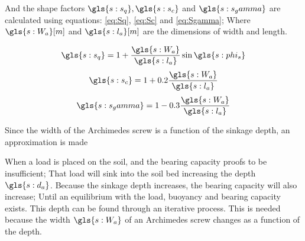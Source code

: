 \noindent And the shape factors $ \gls{s:s_q}, \gls{s:s_c} $ and $ \gls{s:s_gamma} $ are calculated using equations: \ref{eq:Sq}, \ref{eq:Sc} and \ref{eq:Sgamma}; Where $ \gls{s:W_a}  [m]$ and $ \gls{s:l_a} [m] $ are the dimensions of width and length.

\begin{sBox}
	\begin{equation}\label{eq:Sq}
	\gls{s:s_q} = 1 + \frac{\gls{s:W_a}}{\gls{s:l_a}} \sin \gls{s:phi_s}
	\end{equation}
	\begin{equation}\label{eq:Sc}
	\gls{s:s_c} = 1 + 0.2 \frac{\gls{s:W_a}}{\gls{s:l_a}}
	\end{equation}
	\begin{equation}\label{eq:Sgamma}
	\gls{s:s_gamma} = 1 - 0.3 \frac{\gls{s:W_a}}{\gls{s:l_a}}
	\end{equation}
\end{sBox}

\noindent Since the width of the Archimedes screw is a function of the sinkage depth, an approximation is made

When a load is placed on the soil, and the bearing capacity proofs to be insufficient; That load will sink into the soil bed increasing the depth $ \gls{s:d_a} $. Because the sinkage depth increases, the bearing capacity will also increase; Until an equilibrium with the load, buoyancy and bearing capacity exists. This depth can be found through an iterative process. This is needed because the width $ \gls{s:W_a} $ of an Archimedes screw changes as a function of the depth.

